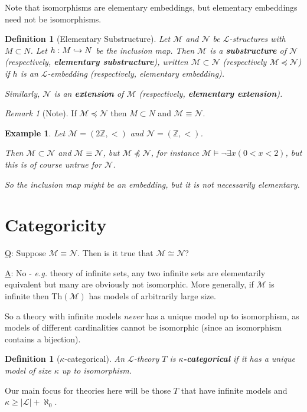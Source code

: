 \documentclass[]{article}
\theoremstyle{custhm}
\theoremstyle{cusdef}
\newtheorem{defin}[theorem]{Definition}
\theoremstyle{custhm}
\theoremstyle{custhm}
\theoremstyle{custhm}
\theoremstyle{ex}
\newtheorem{ex}[theorem]{Example}
\theoremstyle{custhm}
\theoremstyle{cusdef}
\theoremstyle{remark}
\newtheorem*{remark*}{Remark}
\theoremstyle{remark}
\newcommand{\Z}{\mathbb{Z}}
\newcommand{\undf}[1]{\textit{\textbf{#1}}}
\renewcommand{\L}{\mathcal{L}}
\renewcommand{\it}[1]{\textit{#1}}
\newcommand{\M}{\mathcal{M}}
\newcommand{\N}{\mathcal{N}}
\begin{document}
Note that isomorphisms are elementary embeddings, but elementary embeddings need not be isomorphisms.

\begin{defin}[Elementary Substructure]
Let $\M$ and $\N$ be $\L$-structures with $M\subset N$. Let $h:M \xhookrightarrow{} N$ be the inclusion map. Then $\M$ is a \undf{substructure} of $\N$ (respectively, \undf{elementary substructure}), written $\M\subset \N$ (respectively $\M\preceq\N$) if $h$ is an $\L$-embedding (respectively, elementary embedding).

Similarly, $\N$ is an \undf{extension} of $\M$ (respectively, \undf{elementary extension}).
\end{defin}	

\begin{remark*}[Note]
If $\M\preceq\N$ then $M\subset N$ and $\M\equiv \N$.
\end{remark*}
\begin{ex}
Let $\M = (2\Z, <)$ and $\N = (\Z, <)$.

Then $\M \subset \N$ and $\M \equiv \N$, but $\M\not\preceq\N$, for instance $\M\models \neg\exists x(0 < x < 2)$, but this is of course untrue for $\N$.

So the inclusion map might be an embedding, but it is not necessarily elementary.
\end{ex}


\section{Categoricity}

\underline{Q}: Suppose $\M\equiv\N$. Then is it true that $\M \cong \N$?

\underline{A}: No - \it{e.g.} theory of infinite sets, any two infinite sets are elementarily equivalent but many are obviously not isomorphic. More generally, if $\M$ is infinite then Th$(\M)$ has models of arbitrarily large size.

So a theory with infinite models \it{never} has a unique model up to isomorphism, as models of different cardinalities cannot be isomorphic (since an isomorphism contains a bijection).

\begin{defin}[$\kappa$-categorical]
An $\L$-theory $T$ is \undf{$\kappa$-categorical} if it has a unique model of size $\kappa$ up to isomorphism.
\end{defin}
Our main focus for theories here will be those $T$ that have infinite models and $\kappa \ge |\L| + \aleph_0$.
\end{document}
